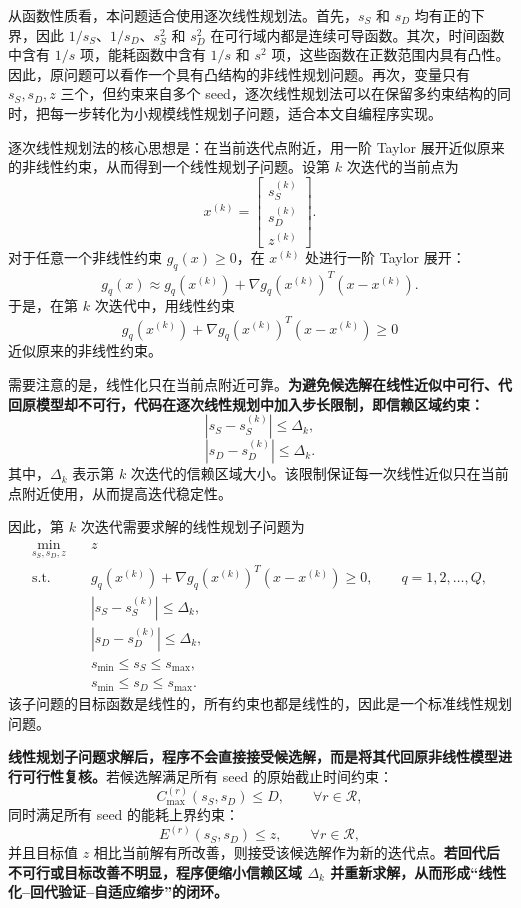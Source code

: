 从函数性质看，本问题适合使用逐次线性规划法。首先，$s_S$ 和 $s_D$ 均有正的下界，因此 $1/s_S$、$1/s_D$、$s_S^2$ 和 $s_D^2$ 在可行域内都是连续可导函数。其次，时间函数中含有 $1/s$ 项，能耗函数中含有 $1/s$ 和 $s^2$ 项，这些函数在正数范围内具有凸性。因此，原问题可以看作一个具有凸结构的非线性规划问题。再次，变量只有 $s_S,s_D,z$ 三个，但约束来自多个 seed，逐次线性规划法可以在保留多约束结构的同时，把每一步转化为小规模线性规划子问题，适合本文自编程序实现。

逐次线性规划法的核心思想是：在当前迭代点附近，用一阶 Taylor 展开近似原来的非线性约束，从而得到一个线性规划子问题。设第 $k$ 次迭代的当前点为
\[
x^{(k)}
=
\begin{bmatrix}
	s_S^{(k)}\\
	s_D^{(k)}\\
	z^{(k)}
\end{bmatrix}.
\]
对于任意一个非线性约束 $g_q(x)\geq 0$，在 $x^{(k)}$ 处进行一阶 Taylor 展开：
\[
g_q(x)
\approx
g_q(x^{(k)})
+
\nabla g_q(x^{(k)})^T
\left(
x-x^{(k)}
\right).
\]
于是，在第 $k$ 次迭代中，用线性约束
\[
g_q(x^{(k)})
+
\nabla g_q(x^{(k)})^T
\left(
x-x^{(k)}
\right)
\geq 0
\]
近似原来的非线性约束。

需要注意的是，线性化只在当前点附近可靠。\textbf{为避免候选解在线性近似中可行、代回原模型却不可行，代码在逐次线性规划中加入步长限制，即信赖区域约束：}
\[
|s_S-s_S^{(k)}|\leq \Delta_k,
\]
\[
|s_D-s_D^{(k)}|\leq \Delta_k.
\]
其中，$\Delta_k$ 表示第 $k$ 次迭代的信赖区域大小。该限制保证每一次线性近似只在当前点附近使用，从而提高迭代稳定性。

因此，第 $k$ 次迭代需要求解的线性规划子问题为
\[
\begin{aligned}
	\min_{s_S,s_D,z}\quad
	& z\\
	\mathrm{s.t.}\quad
	& g_q(x^{(k)})
	+
	\nabla g_q(x^{(k)})^T
	\left(
	x-x^{(k)}
	\right)
	\geq 0,
	\qquad q=1,2,\ldots,Q,\\
	& |s_S-s_S^{(k)}|\leq \Delta_k,\\
	& |s_D-s_D^{(k)}|\leq \Delta_k,\\
	& s_{\min}\leq s_S\leq s_{\max},\\
	& s_{\min}\leq s_D\leq s_{\max}.
\end{aligned}
\]
该子问题的目标函数是线性的，所有约束也都是线性的，因此是一个标准线性规划问题。

\textbf{线性规划子问题求解后，程序不会直接接受候选解，而是将其代回原非线性模型进行可行性复核。}若候选解满足所有 seed 的原始截止时间约束：
\[
C_{\max}^{(r)}(s_S,s_D)\leq D,
\qquad
\forall r\in\mathcal{R},
\]
同时满足所有 seed 的能耗上界约束：
\[
E^{(r)}(s_S,s_D)\leq z,
\qquad
\forall r\in\mathcal{R},
\]
并且目标值 $z$ 相比当前解有所改善，则接受该候选解作为新的迭代点。\textbf{若回代后不可行或目标改善不明显，程序便缩小信赖区域 $\Delta_k$ 并重新求解，从而形成“线性化--回代验证--自适应缩步”的闭环。}


